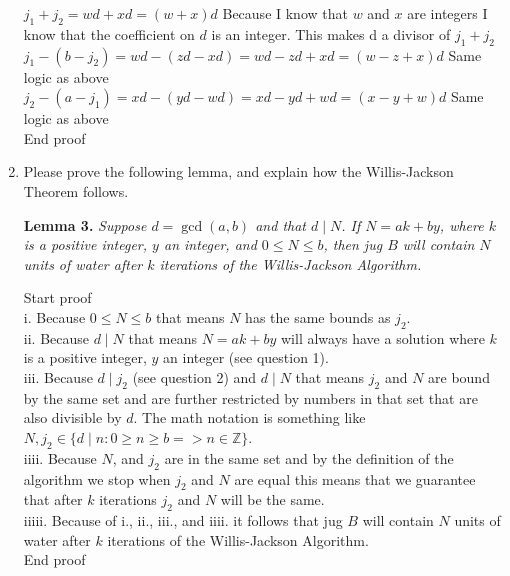 \documentclass[10pt, AMS Euler]{article}
\newcommand{\Z}{\mathbb{Z}}
\begin{document}
\begin{enumerate}
                $ j_1 + j_2 = wd + xd = (w + x) d  $ Because I know that $w$ and $x$ are integers I know that the coefficient on $d$ is an integer. This makes d a divisor of $j_1 + j_2$ \\
    
                $ j_1 -(b - j_2) = wd -(zd - xd) = wd - zd + xd = (w - z + x)d $ Same logic as above \\
    
                $ j_2 - (a - j_1) = xd - (yd - wd) = xd - yd + wd = (x - y + w)d $ Same logic as above \\

            End proof \\
  
		\newpage
		\item Please prove the following lemma, and explain how the Willis-Jackson Theorem follows.
		
		{\bf Lemma 3.} \emph{Suppose $d = \gcd(a,b)$ and that $d \mid N$. If $N = ak + by$, where $k$ is a positive integer, $y$ an integer, and $0 \leq N \leq b$, then jug $B$ will contain $N$ units of water after $k$ iterations of the Willis-Jackson Algorithm.}
            
            Start proof \\

                i. Because $0 \leq N \leq b$ that means $N$ has the same bounds as $j_2$. \\

                ii. Because $d \mid N$ that means $N = ak + by$ will always have a solution where $k$ is a positive integer, $y$ an integer (see question 1). \\

                iii. Because $d \mid j_2$ (see question 2) and $d \mid N$ that means $j_2$ and $N$ are bound by the same set and are further restricted by numbers in that set that are also divisible by $d$. The math notation is something like $N, j_2 \in \{d\;|\; n : 0 \geq n \geq b => n \in \Z \}$. \\

                iiii. Because $N$, and $j_2$ are in the same set and by the definition of the algorithm we stop when $j_2$ and $N$ are equal this means that we guarantee that after $k$ iterations $j_2$ and $N$ will be the same. \\

                iiiii. Because of i., ii., iii., and iiii. it follows that jug $B$ will contain $N$ units of water after $k$ iterations of the Willis-Jackson Algorithm. \\

            End proof \\
		
	\end{enumerate}
	
	\noindent \underline{\hspace{3in}}\\
	
\end{document}
